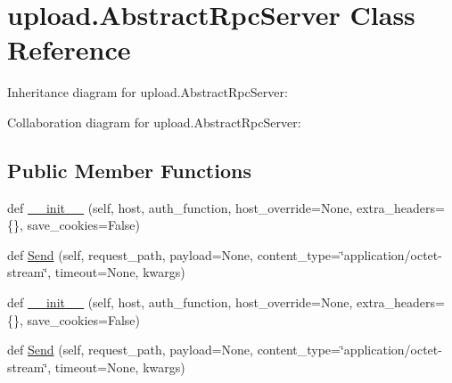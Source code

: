 \hypertarget{classupload_1_1AbstractRpcServer}{}\section{upload.\+Abstract\+Rpc\+Server Class Reference}
\label{classupload_1_1AbstractRpcServer}


Inheritance diagram for upload.\+Abstract\+Rpc\+Server\+:


Collaboration diagram for upload.\+Abstract\+Rpc\+Server\+:
\subsection*{Public Member Functions}
\begin{DoxyCompactItemize}
\item 
def \hyperlink{classupload_1_1AbstractRpcServer_a3f6bc1bd16b52bd5a5c33a1fedeef2d0}{\+\_\+\+\_\+init\+\_\+\+\_\+} (self, host, auth\+\_\+function, host\+\_\+override=None, extra\+\_\+headers=\{\}, save\+\_\+cookies=False)
\item 
def \hyperlink{classupload_1_1AbstractRpcServer_ac1b913f8bd00da4741c47ab49ea94cb5}{Send} (self, request\+\_\+path, payload=None, content\+\_\+type=\char`\"{}application/octet-\/stream\char`\"{}, timeout=None, kwargs)
\item 
def \hyperlink{classupload_1_1AbstractRpcServer_a3f6bc1bd16b52bd5a5c33a1fedeef2d0}{\+\_\+\+\_\+init\+\_\+\+\_\+} (self, host, auth\+\_\+function, host\+\_\+override=None, extra\+\_\+headers=\{\}, save\+\_\+cookies=False)
\item 
def \hyperlink{classupload_1_1AbstractRpcServer_ac1b913f8bd00da4741c47ab49ea94cb5}{Send} (self, request\+\_\+path, payload=None, content\+\_\+type=\char`\"{}application/octet-\/stream\char`\"{}, timeout=None, kwargs)
\end{DoxyCompactItemize}
